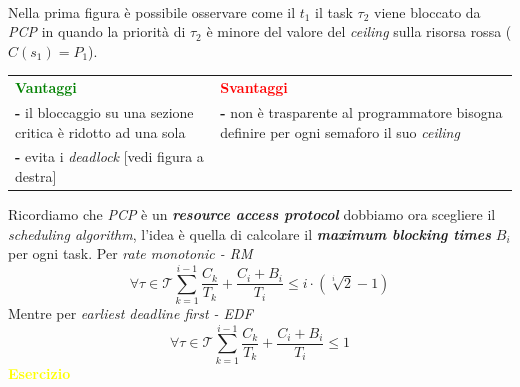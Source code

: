 \\
Nella prima figura è possibile osservare come il $t_1$ il task $\tau_2$ viene bloccato da \textit{PCP} in quando la priorità di $\tau_2$ è minore del valore del \textit{ceiling} sulla risorsa rossa ($C(s_1) = P_1$).
\begin{center}
    \begin{tabular}{ p{7.25cm} | p{7.25cm} }
        \textcolor{green}{\textbf{Vantaggi}} & \textcolor{red}{\textbf{Svantaggi}} \\
        \textbf{-} il bloccaggio su una sezione critica è ridotto ad una sola & \textbf{-} non è trasparente al programmatore bisogna definire per ogni semaforo il suo \textit{ceiling} \\
        \textbf{-} evita i \textit{deadlock} [vedi figura a destra] &  \\
    \end{tabular}
\end{center}
Ricordiamo che \textit{PCP} è un \textbf{\textit{resource access protocol}} dobbiamo ora scegliere il \textit{scheduling algorithm}, l'idea è quella di calcolare il \textbf{\textit{maximum blocking times}} $B_i$ per ogni task. Per \textit{rate monotonic - RM} \[\forall \tau \in \mathcal{T} \sum_{k=1}^{i-1}\frac{C_k}{T_k} + \frac{C_i + B_i}{T_i} \leq i \cdot (\sqrt[i]{2} - 1)\]
Mentre per \textit{earliest deadline first - EDF} \[\forall \tau \in \mathcal{T} \sum_{k=1}^{i-1}\frac{C_k}{T_k} + \frac{C_i + B_i}{T_i} \leq 1\]
\textcolor{yellow}{\textbf{Esercizio}}

\newpage
